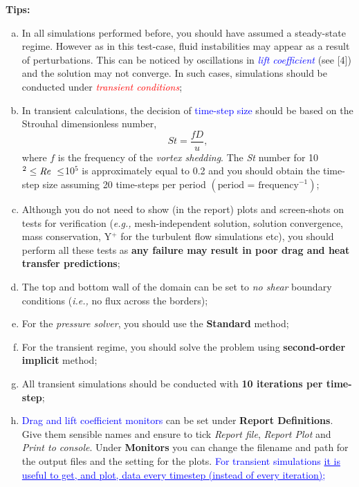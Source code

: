\documentclass[12pts,a4paper,amsmath,amssymb,floatfix]{article}%
\newcommand{\frc}{\displaystyle\frac}
\newcommand{\red}{\textcolor{red}}
\newcommand{\blue}{\textcolor{blue}}
\newcommand{\eg}{{\it e.g., }}
\newcommand{\ie}{{\it i.e., }}
\newcommand\Rey{\mbox{\textit{Re}}\,\,}
\begin{document}
     \begin{shaded}
        \begin{center} {\bf Tips: } \end{center}
        \begin{enumerate}[a)]
          \item In all simulations performed before, you should have assumed a steady-state regime. However as in this test-case, fluid instabilities may appear as a result of perturbations. This can be noticed by oscillations in \blue{\it lift coefficient} (see [4]) and the solution may not converge. In such cases, simulations should be conducted under \red{\it transient conditions};
           \item In transient calculations, the decision of \blue{time-step size} should be based on the Strouhal dimensionless number,
             \begin{displaymath}
               St = \frc{f D}{u},
             \end{displaymath}
             where $f$ is the frequency of the {\it vortex shedding}. The {\it St} number for 10$^{2}\le\Rey\le$10$^{5}$ is approximately equal to 0.2 and you should obtain the time-step size assuming 20 time-steps per period $\left(\text{period = frequency}^{-1}\right)$;
             \item Although you do not need to show (in the report) plots and screen-shots on tests for verification (\eg mesh-independent solution, solution convergence, mass conservation, Y$^{+}$ for the turbulent flow simulations etc), you should perform all these tests as {\bf any failure may result in poor drag and heat transfer predictions};
             \item The top and bottom wall of the domain can be set to {\it no shear} boundary conditions (\ie no flux across the borders);
             \item For the {\it pressure solver}, you should use the {\bf Standard} method;
             \item For the transient regime, you should solve the problem using {\bf second-order implicit} method;  
             \item All transient simulations should be conducted with {\bf 10 iterations per time-step};
             \item \blue{Drag and lift coefficient monitors} can be set under {\bf Report Definitions}. Give them sensible names and ensure to tick \emph{Report file}, \emph{Report Plot} and \emph{Print to console}. Under {\bf Monitors} you can change the filename and path for the output files and the setting for the plots. \blue{For transient simulations \underline{it is useful to get, and plot, data every timestep (instead of every iteration)};}

\end{enumerate}
\end{shaded}
\end{document}
